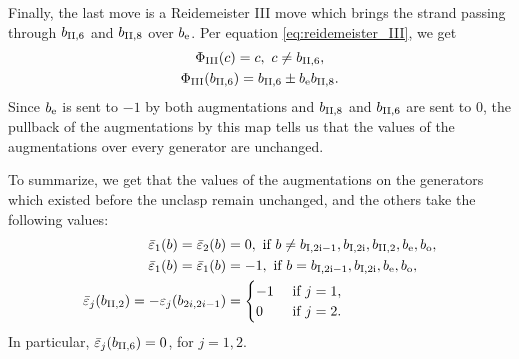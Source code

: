 \documentclass[11pt]{amsart}
\theoremstyle{plain}
\theoremstyle{remark}
\numberwithin{equation}{section}
\begin{document}
Finally, the last move is a Reidemeister III move which brings the strand passing through $b_{\rm II,6}$ and $b_{\rm II,8}$ over $b_{\rm e}$. Per equation \ref{eq:reidemeister_III}, we get \begin{gather*}\Phi_{\rm III}(c)= c, \ c\neq b_{\rm II,6},\\ \Phi_{\rm III}(b_{\rm II,6})=b_{\rm II,6}\pm b_{\rm e}b_{\rm II,8}.\end{gather*} Since $b_{\rm e}$ is sent to $-1$ by both augmentations and $b_{\rm II,8}$ and $b_{\rm II,6}$ are sent to 0, the pullback of the augmentations by this map tells us that the values of the augmentations over every generator are unchanged. 

To summarize, we get that the values of the augmentations on the generators which existed before the unclasp remain unchanged, and the others take the following values:
\begin{align*}
\bar\varepsilon_1(b)=\bar\varepsilon_2(b)&=  0, \text{ if $b\neq b_{\rm I,2i-1},b_{\rm I,2i},b_{\rm II,2},b_{\rm e},b_{\rm o}$},\\
\bar\varepsilon_1(b)=\bar\varepsilon_1(b)&=-1, \text{ if $b= b_{\rm I,2i-1},b_{\rm I,2i},b_{\rm e},b_{\rm o}$},\\
\bar\varepsilon_j(b_{\rm II,2})=-\varepsilon_j(b_{2i,2i-1})&=\begin{cases} -1 &\text{ if $j=1$},\\ 0 &\text{ if $j=2$}.\end{cases}
\end{align*}
In particular, $\bar\varepsilon_j(b_{\rm II,6})=0$, for $j=1,2$.
\end{document}
